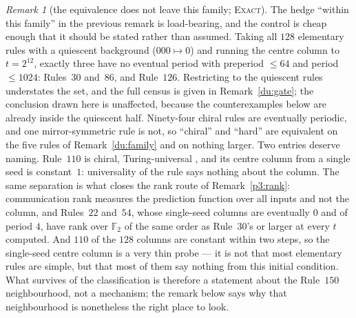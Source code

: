 \documentclass[11pt]{article}
\theoremstyle{definition}
\theoremstyle{remark}
\newtheorem{remark}[theorem]{Remark}
\newcommand{\F}{\mathbb{F}_2}
\newcommand{\EXACT}{\textsc{Exact}}
\begin{document}
\begin{remark}[the equivalence does not leave this family; \EXACT]\label{du:family256}
The hedge ``within this family'' in the previous remark is load-bearing, and the control is cheap enough
that it should be stated rather than assumed. Taking all $128$ elementary rules with a quiescent
background ($000\mapsto0$) and running the centre column to $t=2^{12}$, exactly three have no eventual
period with preperiod $\le64$ and period $\le1024$: Rules~$30$ and~$86$, and Rule~$126$. Restricting to
the quiescent rules understates the set, and the full census is given in Remark~\ref{du:gate}; the
conclusion drawn here is unaffected, because the counterexamples below are already inside the quiescent
half. Ninety-four chiral rules are eventually periodic, and one
mirror-symmetric rule is not, so ``chiral'' and ``hard'' are equivalent on the five rules of
Remark~\ref{du:family} and on nothing larger. Two entries deserve naming. Rule~$110$ is chiral,
Turing-universal \cite{Cook}, and its centre column from a single seed is constant~$1$: universality of
the rule says nothing about the column. The same separation is what closes the rank route of
Remark~\ref{p3:rank}: communication rank measures the prediction function over all inputs and not the
column, and Rules~$22$ and~$54$, whose single-seed columns are eventually $0$ and of period $4$, have
rank over $\F$ of the same order as Rule~30's or larger at every $t$ computed.
And $110$ of the $128$ columns are constant within two steps, so the single-seed centre column is a very
thin probe --- it is not that most elementary rules are simple, but that most of them say nothing from
this initial condition. What survives of the classification is therefore a statement about the
Rule~$150$ neighbourhood, not a mechanism; the remark below says why that neighbourhood is nonetheless
the right place to look.
\end{remark}
\end{document}
